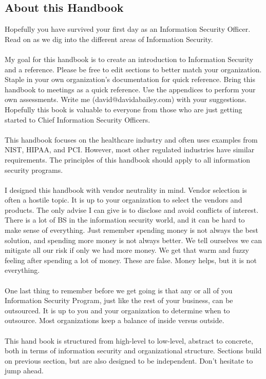 \subsection{About this Handbook}
Hopefully you have survived your first day as an Information Security Officer. Read on as we dig into the different areas of Information Security.\\\\
My goal for this handbook is to create an introduction to Information Security and a reference. Please be free to edit sections to better match your organization. Staple in your own organization's documentation for quick reference. Bring this handbook to meetings as a quick reference. Use the appendices to perform your own assessments. Write me (david@davidabailey.com) with your suggestions. Hopefully this book is valuable to everyone from those who are just getting started to Chief Information Security Officers.\\\\
This handbook focuses on the healthcare industry and often uses examples from NIST, HIPAA, and PCI. However, most other regulated industries have similar requirements. The principles of this handbook should apply to all information security programs.\\\\I designed this handbook with vendor neutrality in mind. Vendor selection is often a hostile topic. It is up to your organization to select the vendors and products. The only advise I can give is to disclose and avoid conflicts of interest. There is a lot of BS in the information security world, and it can be hard to make sense of everything. Just remember spending money is not always the best solution, and spending more money is not always better. We tell ourselves we can mitigate all our risk if only we had more money. We get that warm and fuzzy feeling after spending a lot of money. These are false. Money helps, but it is not everything.\\\\
One last thing to remember before we get going is that any or all of you Information Security Program, just like the rest of your business, can be outsourced. It is up to you and your organization to determine when to outsource. Most organizations keep a balance of inside versus outside.\\\\This hand book is structured from high-level to low-level, abstract to concrete, both in terms of information security and organizational structure. Sections build on previous section, but are also designed to be independent. Don't hesitate to jump ahead.\\\\
